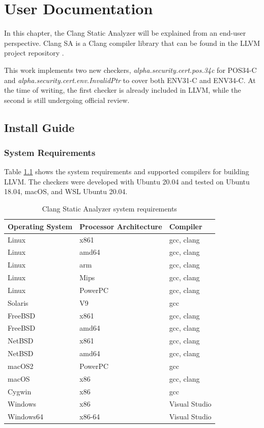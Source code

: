 \chapter{User Documentation} %
\label{ch:user}


In this chapter, the Clang Static Analyzer will be explained from an end-user perspective. Clang SA is a Clang compiler library that can be found in the LLVM project repository \cite{llvm-project}. 

This work implements two new checkers, \emph{alpha.security.cert.pos.34c} for POS34-C and \emph{alpha.security.cert.env.InvalidPtr} to cover both ENV31-C and ENV34-C. At the time of writing, the first checker is already included in LLVM, while the second is still undergoing official review. 


\section{Install Guide}


\subsection{System Requirements}
Table \ref{tab:sys-req} shows the system requirements and supported compilers for building LLVM. The checkers were developed with Ubuntu 20.04 and tested on Ubuntu 18.04, macOS, and WSL Ubuntu 20.04.


\begin{table}[H]
	\centering
	\begin{tabular}{ | m{} | m{} | m{} |}
		\hline
		\textbf{Operating System} & \textbf{Processor Architecture} & \textbf{Compiler} \\
		\hline \hline
		Linux & x861 & gcc, clang\\
		\hline
		Linux & amd64 & gcc, clang\\
		\hline
		Linux & arm & gcc, clang\\
		\hline
		Linux & Mips & gcc, clang\\
		\hline
		Linux & PowerPC & gcc, clang\\
		\hline
		Solaris & V9 & gcc\\
		\hline
		FreeBSD & x861 & gcc, clang\\
		\hline
		FreeBSD & amd64 & gcc, clang\\
		\hline
		NetBSD & x861 & gcc, clang\\
		\hline
		NetBSD & amd64 & gcc, clang\\
		\hline
		macOS2 & PowerPC & gcc\\
		\hline
		macOS & x86 & gcc, clang\\
		\hline
		Cygwin & x86 & gcc\\
		\hline
		Windows & x86 & Visual Studio\\
		\hline
		Windows64 & x86-64 & Visual Studio\\
		\hline
	\end{tabular}
	\caption{Clang Static Analyzer system requirements}
	\label{tab:sys-req}
\end{table}

